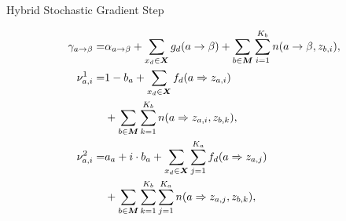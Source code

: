 \begin{frame}{Hybrid Stochastic Gradient Step}

\begin{align}
   \gamma_{a \rightarrow \beta} = &  \alpha_{a \rightarrow\beta}
  + \sum_{x_d \in \boldsymbol{X}} g_d(a \rightarrow \beta) \notag + \sum_{b \in \boldsymbol{M}} \sum_{i=1}^{K_b} n(a
  \rightarrow \beta, z_{b, i}), \notag \\
   \nu^1_{a, i} = &  1- b_a + \sum_{x_d \in
    \boldsymbol{X}} f_{d}(a \Rightarrow z_{a,i}) \notag \\
  &  + \sum_{b \in \boldsymbol{M}} \sum_{k=1}^{K_b} n(a
  \Rightarrow z_{a, i}, z_{b, k}), \notag \\
   \nu^2_{a, i} = &  a_a + i \cdot b_a +
  \sum_{x_d \in \boldsymbol{X}} \sum_{j=1}^{K_a} f_{d}(a \Rightarrow
  z_{a, j}) \notag \\
  &  + \sum_{b \in \boldsymbol{M}} \sum_{k=1}^{K_b}
  \sum_{j=1}^{K_a} n(a \Rightarrow z_{a, j}, z_{b, k}), \notag
\end{align}


\end{frame}


